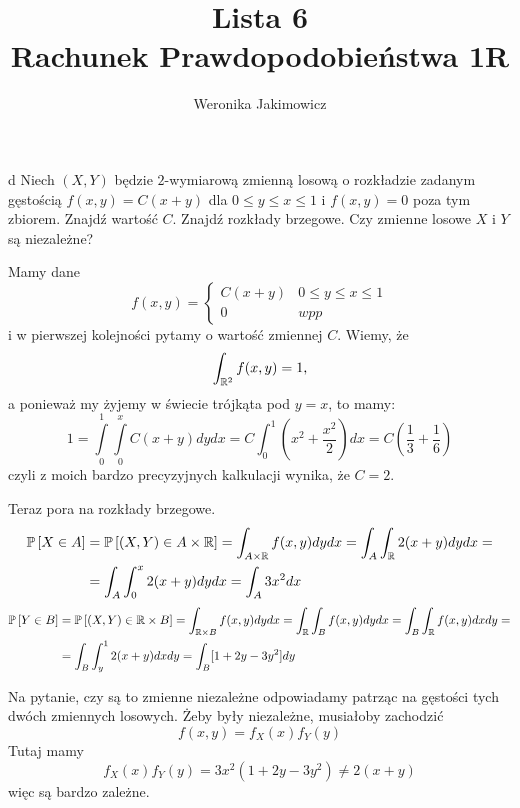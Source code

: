 \documentclass{article}
\title{Lista 6\\{\normalsize Rachunek Prawdopodobieństwa 1R}}
\author{Weronika Jakimowicz}
\date{}
\begin{document}
\maketitle
\thispagestyle{empty}

\begin{problem}{d}
Niech $(X,Y)$ będzie $2$-wymiarową zmienną losową o rozkładzie zadanym gęstością $f(x,y)=C(x+y)$ dla $0\leq y\leq x\leq 1$ i $f(x,y)=0$ poza tym zbiorem. Znajdź wartość $C$. Znajdź rozkłady brzegowe. Czy zmienne losowe $X$ i $Y$ są niezależne?
\end{problem}

\begin{wrapfigure}{r}{0.25\textwidth}
\end{wrapfigure}
Mamy dane
$$f(x,y)=\begin{cases}C(x+y)&0\leq y\leq x\leq1\\0&wpp\end{cases}$$
i w pierwszej kolejności pytamy o wartość zmiennej $C$. Wiemy, że 
$$\int_{\mathbb{R}^2}f(x,y)=1,$$ 
a ponieważ my żyjemy w świecie trójkąta pod $y=x$, to mamy:
$$1=\int\limits_0^1\int\limits_0^xC(x+y)dydx=C\int_0^1(x^2+\frac{x^2}{2})dx=C(\frac{1}{3}+\frac{1}{6})$$
czyli z moich bardzo precyzyjnych kalkulacji wynika, że $C=2$.

Teraz pora na rozkłady brzegowe. 
\begin{align*}
    \prob{X\in A}&=\prob{(X,Y)\in A\times\R}=\int_{A\times\R}f(x,y)dydx=\int_A\int_\R2(x+y)dydx=\\
    &=\int_A\int_0^x2(x+y)dydx=\int_A{3x^2}dx
\end{align*}
\begin{align*}
    \prob{Y\in B}&=\prob{(X,Y)\in\R\times B}=\int_{\R\times B}f(x,y)dydx=\int_\R\int_Bf(x,y)dydx=\int_B\int_\R f(x,y)dxdy=\\
    &=\int_B\int_y^12(x+y)dxdy=\int_B[1+2y-3y^2]dy
\end{align*}

Na pytanie, czy są to zmienne niezależne odpowiadamy patrząc na gęstości tych dwóch zmiennych losowych. Żeby były niezależne, musiałoby zachodzić
$$f(x,y)=f_X(x)f_Y(y)$$
Tutaj mamy
$$f_X(x)f_Y(y)=3x^2(1+2y-3y^2)\neq2(x+y)$$
więc są bardzo zależne.
\end{document}
